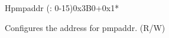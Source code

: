 \begin{register}{H}{pmpaddr (: 0-15)}{0x3B0+0x1*}\label{regdesc:pmpaddrN}
%
\regnewline%
\begin{regdesc}\begin{reglist}
\label{fielddesc:ADDR}\item [address] Configures the address for pmpaddr. (R/W)
\end{reglist}\end{regdesc}
\end{register}

